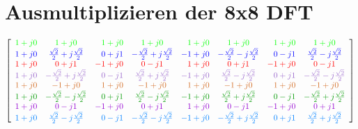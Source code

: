\section{Ausmultiplizieren der 8x8 DFT}\label{anhang:ausmultiplizieren}


\vspace{1cm}

\begingroup
\renewcommand*{\arraystretch}{1.1} %
\renewcommand*{\arraycolsep}{5.5pt} %
$\left[
\begin{array}{rcrcrcrc}
  \textcolor{green}{1+j0}	& \textcolor{green}{1+j0}					& \textcolor{green}{1+j0}	& \textcolor{green}{1+j0}					& \textcolor{green}{1+j0}	& \textcolor{green}{1+j0} 					& \textcolor{green}{1+j0}	& \textcolor{green}{1+j0} \\
  \textcolor{blue}{1+j0}	& \textcolor{blue}{\frac{\sqrt{2}}{2}+j\frac{\sqrt{2}}{2}}	& \textcolor{blue}{0+j1}	& \textcolor{blue}{-\frac{\sqrt{2}}{2}+j\frac{\sqrt{2}}{2}}	& \textcolor{blue}{-1+j0}	& \textcolor{blue}{-\frac{\sqrt{2}}{2}-j\frac{\sqrt{2}}{2}} 	& \textcolor{blue}{0-j1}	& \textcolor{blue}{\frac{\sqrt{2}}{2}-j\frac{\sqrt{2}}{2}} \\
  \textcolor{red}{1+j0}		& \textcolor{red}{0+j1}						& \textcolor{red}{-1+j0}	& \textcolor{red}{0-j1}						& \textcolor{red}{1+j0}		& \textcolor{red}{0+j1} 					& \textcolor{red}{-1+j0}	& \textcolor{red}{0-j1} \\
  \textcolor{lila}{1+j0}	& \textcolor{lila}{-\frac{\sqrt{2}}{2}+j\frac{\sqrt{2}}{2}}	& \textcolor{lila}{0-j1}	& \textcolor{lila}{\frac{\sqrt{2}}{2}+j\frac{\sqrt{2}}{2}}	& \textcolor{lila}{-1+j0}	& \textcolor{lila}{\frac{\sqrt{2}}{2}-j\frac{\sqrt{2}}{2}} 	& \textcolor{lila}{0+j1}	& \textcolor{lila}{-\frac{\sqrt{2}}{2}-j\frac{\sqrt{2}}{2}} \\
  \textcolor{cinnamon}{1+j0}	& \textcolor{cinnamon}{-1+j0}					& \textcolor{cinnamon}{1+j0}	& \textcolor{cinnamon}{-1+j0}					& \textcolor{cinnamon}{1+j0}	& \textcolor{cinnamon}{-1+j0} 					& \textcolor{cinnamon}{1+j0}	& \textcolor{cinnamon}{-1+j0} \\
  \textcolor{mygreen}{1+j0}	& \textcolor{mygreen}{-\frac{\sqrt{2}}{2}-j\frac{\sqrt{2}}{2}}	& \textcolor{mygreen}{0+j1}	& \textcolor{mygreen}{\frac{\sqrt{2}}{2}-j\frac{\sqrt{2}}{2}}	& \textcolor{mygreen}{-1+j0}	& \textcolor{mygreen}{\frac{\sqrt{2}}{2}+j\frac{\sqrt{2}}{2}}	& \textcolor{mygreen}{0-j1}	& \textcolor{mygreen}{-\frac{\sqrt{2}}{2}+j\frac{\sqrt{2}}{2}} \\
  \textcolor{mymauve}{1+j0}	& \textcolor{mymauve}{0-j1}					& \textcolor{mymauve}{-1+j0}	& \textcolor{mymauve}{0+j1}					& \textcolor{mymauve}{1+j0}	& \textcolor{mymauve}{0-j1} 					& \textcolor{mymauve}{-1+j0}	& \textcolor{mymauve}{0+j1} \\
  \textcolor{azure}{1+j0}	& \textcolor{azure}{\frac{\sqrt{2}}{2}-j\frac{\sqrt{2}}{2}}	& \textcolor{azure}{0-j1}	& \textcolor{azure}{-\frac{\sqrt{2}}{2}-j\frac{\sqrt{2}}{2}}	& \textcolor{azure}{-1+j0}	& \textcolor{azure}{-\frac{\sqrt{2}}{2}+j\frac{\sqrt{2}}{2}} 	& \textcolor{azure}{0+j1}	& \textcolor{azure}{\frac{\sqrt{2}}{2}+j\frac{\sqrt{2}}{2}} \\
 \end{array}
 \right]$
\endgroup

